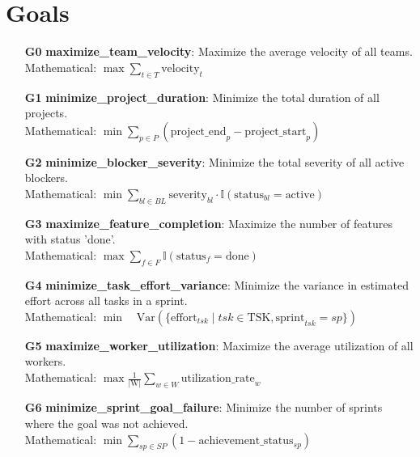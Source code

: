 \documentclass[11pt]{article}
\begin{document}
\section{Goals}
\begin{itemize}
    \item[\textbf{G0}] \textbf{maximize\_team\_velocity}: Maximize the average velocity of all teams.
    \\ Mathematical: $\max \sum_{t \in T} \text{velocity}_{t}$
    \item[\textbf{G1}] \textbf{minimize\_project\_duration}: Minimize the total duration of all projects.
    \\ Mathematical: $\min \sum_{p \in P} (\text{project\_end}_p - \text{project\_start}_p)$
    \item[\textbf{G2}] \textbf{minimize\_blocker\_severity}: Minimize the total severity of all active blockers.
    \\ Mathematical: $\min \sum_{bl \in BL} \text{severity}_{bl} \cdot \mathbb{I}(\text{status}_{bl} = \text{active})$
    \item[\textbf{G3}] \textbf{maximize\_feature\_completion}: Maximize the number of features with status 'done'.
    \\ Mathematical: $\max \sum_{f \in F} \mathbb{I}(\text{status}_f = \text{done})$
    \item[\textbf{G4}] \textbf{minimize\_task\_effort\_variance}: Minimize the variance in estimated effort across all tasks in a sprint.
    \\ Mathematical: $\min \quad \text{Var}(\{\text{effort}_{tsk} \mid tsk \in \text{TSK}, \text{sprint}_{tsk} = sp\})$
    \item[\textbf{G5}] \textbf{maximize\_worker\_utilization}: Maximize the average utilization of all workers.
    \\ Mathematical: $\max \frac{1}{|\text{W}|} \sum_{w \in W} \text{utilization\_rate}_w$
    \item[\textbf{G6}] \textbf{minimize\_sprint\_goal\_failure}: Minimize the number of sprints where the goal was not achieved.
    \\ Mathematical: $\min \sum_{sp \in SP} (1 - \text{achievement\_status}_{sp})$
\end{itemize}
\end{document}
